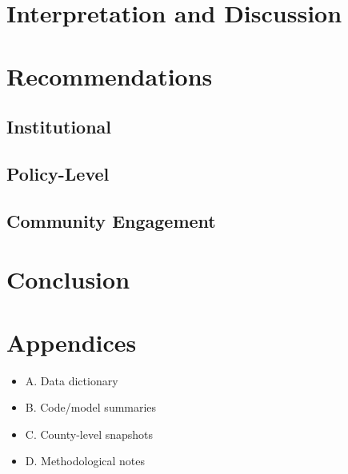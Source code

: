 \documentclass[12pt]{llncs}
\begin{document}
\section{Interpretation and Discussion}


\section{Recommendations}
\subsection{Institutional}

\subsection{Policy-Level}

\subsection{Community Engagement}


\section{Conclusion}


\section{Appendices}
\begin{itemize}
  \item A. Data dictionary
  \item B. Code/model summaries
  \item C. County-level snapshots
  \item D. Methodological notes
\end{itemize}

\printbibliography
\end{document}
